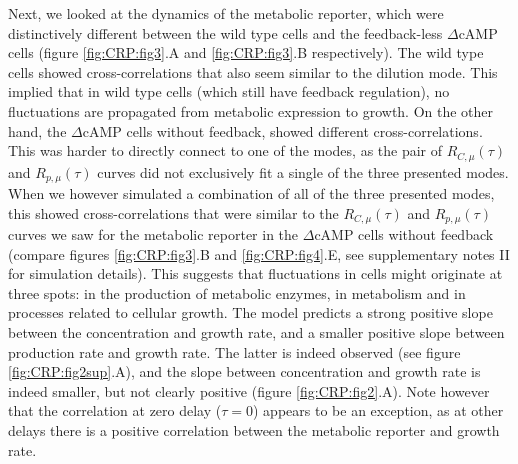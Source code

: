 Next, we looked at the dynamics of the metabolic reporter, which were distinctively different 
between the wild type cells %
and the feedback-less $\Delta$cAMP cells (figure \ref{fig:CRP:fig3}.A and \ref{fig:CRP:fig3}.B respectively).
%
The wild type cells showed cross-correlations that also seem similar to the dilution mode.
This implied that in wild type cells (which still have feedback regulation), 
no fluctuations are propagated from metabolic expression to growth.
%
On the other hand, the $\Delta$cAMP cells without feedback, showed different cross-correlations.
%
This was harder to directly connect to one of the modes, as the pair of $R_{C,\mu}(\tau)$ and $R_{p,\mu}(\tau)$ curves 
did not exclusively fit a single of the three presented modes.
%
When we however simulated a combination of all of the three presented modes,
this showed cross-correlations that were similar to 
the $R_{C,\mu}(\tau)$ and $R_{p,\mu}(\tau)$ curves we saw for the metabolic reporter in
the $\Delta$cAMP cells without feedback 
(compare figures \ref{fig:CRP:fig3}.B and \ref{fig:CRP:fig4}.E, see supplementary notes II for simulation details).
%
This suggests 
that fluctuations in \dcamp cells might originate at three spots:
in the production of metabolic enzymes, in metabolism and in processes related to cellular growth.
%
The model predicts a strong positive slope between the concentration and growth rate, 
and a smaller positive slope between production rate and growth rate.
%
The latter is indeed observed (see figure \ref{fig:CRP:fig2sup}.A),
and the slope between concentration and growth rate is indeed smaller, but not clearly positive (figure \ref{fig:CRP:fig2}.A).
%
Note however that the correlation at zero delay ($\tau=0$) appears to be an exception, 
as at other delays there is a positive correlation between the metabolic reporter and growth rate.
%
%
%
